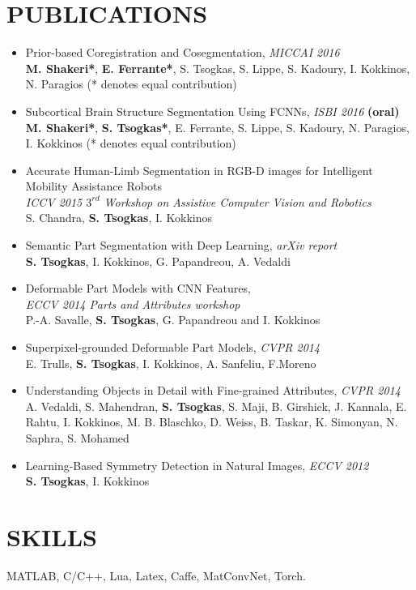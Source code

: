 \documentclass[margin]{res}
\begin{document}
\begin{resume}
\section{PUBLICATIONS} 
	\begin{itemize}
	\item  Prior-based Coregistration and Cosegmentation, \emph{MICCAI 2016}\\
		  \textbf{M. Shakeri*}, \textbf{E. Ferrante*}, S. Tsogkas, S. Lippe, S. Kadoury, I. Kokkinos,  N. Paragios (* denotes equal contribution)   
	\item  Subcortical Brain Structure Segmentation Using FCNNs, \emph{ISBI 2016} \textbf{(oral)}\\
		  \textbf{M. Shakeri*}, \textbf{S. Tsogkas*}, E. Ferrante, S. Lippe, S. Kadoury, N. Paragios, I. Kokkinos (* denotes equal contribution)   
	\item   Accurate Human-Limb Segmentation in RGB-D images for Intelligent Mobility Assistance Robots\\
		   \emph{ICCV 2015 $3^{rd}$ Workshop on Assistive Computer Vision and Robotics}\\
		  S. Chandra, \textbf{S. Tsogkas}, I. Kokkinos
	\item   Semantic Part Segmentation with Deep Learning, \emph{arXiv report}\\
		  \textbf{S. Tsogkas}, I. Kokkinos, G. Papandreou, A. Vedaldi 
	\item  Deformable Part Models with CNN Features,\\ \emph{ECCV 2014 Parts and Attributes workshop}\\
	  P.-A. Savalle, \textbf{S. Tsogkas}, G. Papandreou and I. Kokkinos 
	\item  Superpixel-grounded Deformable Part Models, \emph{CVPR 2014}\\
		  E. Trulls, \textbf{S. Tsogkas}, I. Kokkinos, A. Sanfeliu, F.Moreno
	\item Understanding Objects in Detail with Fine-grained Attributes, \emph{CVPR 2014} \\
	A. Vedaldi, S. Mahendran, \textbf{S. Tsogkas}, S. Maji, B. Girshick, J. Kannala, E. Rahtu, I. Kokkinos, M. B. Blaschko, D. Weiss, B. Taskar, K. Simonyan, N. Saphra, S. Mohamed 
	\item Learning-Based Symmetry Detection in Natural Images, \emph{ECCV 2012} \\
		  \textbf{S. Tsogkas}, I. Kokkinos
	\end{itemize}

\section{SKILLS} MATLAB, C/C++, Lua, Latex, Caffe, MatConvNet, Torch. 
\newline


\end{resume}
\end{document}

